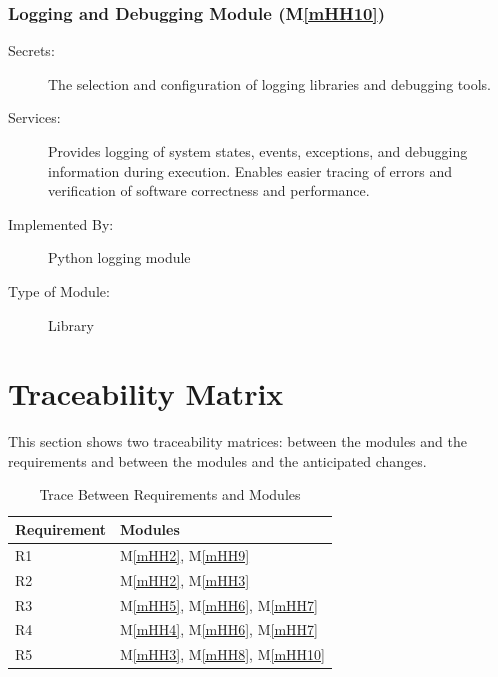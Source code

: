 \documentclass[12pt, titlepage]{article}
\newcommand{\mref}[1]{M\ref{#1}}
\begin{document}
\subsubsection{Logging and Debugging Module (\mref{mHH10})}

\begin{description}
\item[Secrets:] The selection and configuration of logging libraries and debugging tools.
\item[Services:] Provides logging of system states, events, exceptions, and debugging information during execution. Enables easier tracing of errors and verification of software correctness and performance.
\item[Implemented By:] Python logging module
\item[Type of Module:] Library
\end{description}


\section{Traceability Matrix} \label{SecTM}

This section shows two traceability matrices: between the modules and the
requirements and between the modules and the anticipated changes.

\begin{table}[H]
  \centering
  \begin{tabular}{p{} p{}}
  \toprule
  \textbf{Requirement} & \textbf{Modules} \\
  \midrule
  R1 & \mref{mHH2}, \mref{mHH9} \\
  R2 & \mref{mHH2}, \mref{mHH3} \\
  R3 & \mref{mHH5}, \mref{mHH6}, \mref{mHH7} \\
  R4 & \mref{mHH4}, \mref{mHH6}, \mref{mHH7} \\
  R5 & \mref{mHH3}, \mref{mHH8}, \mref{mHH10} \\
  \bottomrule
  \end{tabular}
  \caption{Trace Between Requirements and Modules}
  \label{TblRT}
  \end{table}
  
\end{document}
